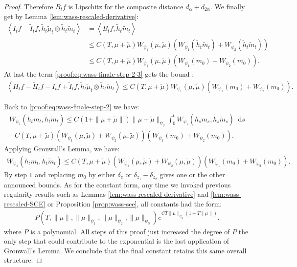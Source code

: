 \documentclass[11pt,a4paper]{article}
\newcommand{\brac}[1]{\left\langle#1\right\rangle}
\newcommand{\dd}{\mathop{}\!\mathrm{d}}
\begin{document}
\begin{proof}
    Therefore $B_tf$ is Lipschitz for the composite distance $d_\alpha + d_{2\alpha}$. We finally get by Lemma \ref{lem:wass-rescaled-derivative}:
    \begin{align*}
        \brac{I_tf - \tilde{I}_tf, \tilde{h}_t\tilde{\mu}_t\otimes \tilde{h}_t\tilde{m}_t} 
        &= \brac{B_tf,\tilde{h}_t\tilde{m}_t} \\
        &\leq C(T,\mu + \tilde{\mu}) W_{\psi_1}(\mu,\tilde{\mu}) \left(W_{\psi_1}(\tilde{h}_t\tilde{m}_t) + W_{\psi_2}(\tilde{h}_t\tilde{m}_t) \right)\\
        &\leq C(T,\mu + \tilde{\mu}) W_{\psi_1}(\mu,\tilde{\mu})\left(W_{\psi_1}(m_0) + W_{\psi_2}(m_0) \right).
    \end{align*}
    At last the term \eqref{proof:eq:wass-finale-step-2-3} gets the bound :
    \begin{align*}
        \brac{H_tf - \tilde{H}_tf - I_tf + \tilde{I}_tf, \tilde{h}_t\tilde{\mu}_t\otimes \tilde{h}_t\tilde{m}_t} 
        \leq C(T,\mu + \tilde{\mu}) W_{\psi_1}(\mu,\tilde{\mu})\left(W_{\psi_1}(m_0) + W_{\psi_2}(m_0) \right).
    \end{align*}

    Back to \eqref{proof:eq:wass-finale-step-2} we have:
    \begin{multline*}
        W_{\psi_1}\left(h_t m_t , \tilde{h}_t \tilde{m}_t \right) \leq C(1 + \|\mu + \tilde{\mu}\|)\|\mu + \tilde{\mu}\|_{\psi_2}\int_0^t W_{\psi_1}\left(h_s m_s , \tilde{h}_s \tilde{m}_s \right) \dd s \\
        + C(T,\mu + \tilde{\mu})\left(W_{\psi_1}\left( \mu , \tilde{\mu}\right) + W_{\psi_2}\left( \mu , \tilde{\mu}\right)\right)\left(W_{\psi_1}(m_0) + W_{\psi_2}(m_0) \right).
    \end{multline*}
    Applying Gronwall's Lemma, we have:
    \begin{align*}
        W_{\psi_1}\left(h_t m_t , \tilde{h}_t \tilde{m}_t \right) \leq C(T,\mu + \tilde{\mu})\left(W_{\psi_1}\left( \mu , \tilde{\mu}\right) + W_{\psi_2}\left( \mu , \tilde{\mu}\right)\right)\left(W_{\psi_1}(m_0) + W_{\psi_2}(m_0) \right).
    \end{align*}
    By step $1$ and replacing $m_0$ by either $\delta_z$ or $\delta_{z_1} - \delta_{z_2}$ gives one or the other announced bounds. As for the constant form, any time we invoked previous regularity results such as Lemmas \ref{lem:wass-rescaled-derivative} and \ref{lem:wass-rescaled-SCE} or Proposition \ref{prop:wass-sce}, all constants had the form:
    \begin{align*}
        P(T,\|\mu\|,\|\mu\|_{\psi_1},\|\mu\|_{\psi_2},\|\mu\|_{\psi_3}) e^{CT\|\mu\|_{\psi_2}(1 + T\|\mu\|)}.
    \end{align*}
    where $P$ is a polynomial. All steps of this proof just increased the degree of $P$ the only step that could contribute to the exponential is the last application of Gronwall's Lemma. We conclude that the final constant retains this same overall structure.
\end{proof}
\end{document}
